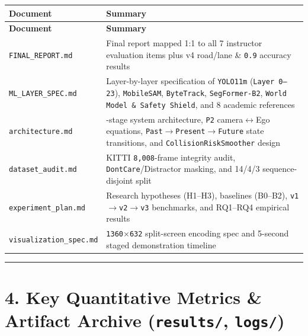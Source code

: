\documentclass[10.5pt,a4paper]{article}
\begin{document}
\begin{footnotesize}
\setlength{\tabcolsep}{4pt}
\setlength{\LTleft}{0pt}\setlength{\LTright}{0pt}
\begin{longtable}{>{\raggedright\arraybackslash}p{} >{\raggedright\arraybackslash}p{}}
\toprule
\textbf{Document} & \textbf{Summary} \\
\midrule
\endfirsthead
\toprule
\textbf{Document} & \textbf{Summary} \\
\midrule
\endhead
\bottomrule
\endfoot
\texttt{FINAL\_\allowbreak{}REPORT.\allowbreak{}md} & Final report mapped 1:1 to all 7 instructor evaluation items plus v4 road/lane \& \texttt{0.\allowbreak{}9} accuracy results \\
\texttt{ML\_\allowbreak{}LAYER\_\allowbreak{}SPEC.\allowbreak{}md} & Layer-by-layer specification of \texttt{YOLO11m} (\texttt{Layer 0--23}), \texttt{MobileSAM}, \texttt{ByteTrack}, \texttt{SegFormer-\allowbreak{}B2}, \texttt{World Model \& Safety Shield}, and 8 academic references \\
\texttt{architecture.\allowbreak{}md} & 7-stage system architecture, \texttt{P2} camera$\leftrightarrow$Ego equations, \texttt{Past$\rightarrow$Present$\rightarrow$Future} state transitions, and \texttt{CollisionRiskSmoother} design \\
\texttt{dataset\_\allowbreak{}audit.\allowbreak{}md} & KITTI \texttt{8,\allowbreak{}008}-frame integrity audit, \texttt{DontCare}/Distractor masking, and 14/4/3 sequence-disjoint split \\
\texttt{experiment\_\allowbreak{}plan.\allowbreak{}md} & Research hypotheses (H1--H3), baselines (B0--B2), \texttt{v1$\rightarrow$v2$\rightarrow$v3} benchmarks, and RQ1--RQ4 empirical results \\
\texttt{visualization\_\allowbreak{}spec.\allowbreak{}md} & \texttt{1360$\times$632} split-screen encoding spec and 5-second staged demonstration timeline \\
\end{longtable}
\end{footnotesize}


\par\noindent\rule{\textwidth}{0.4pt}\par\medskip

\section{4. Key Quantitative Metrics \& Artifact Archive (\texttt{results/\allowbreak{}}, \texttt{logs/\allowbreak{}})}
\end{document}
